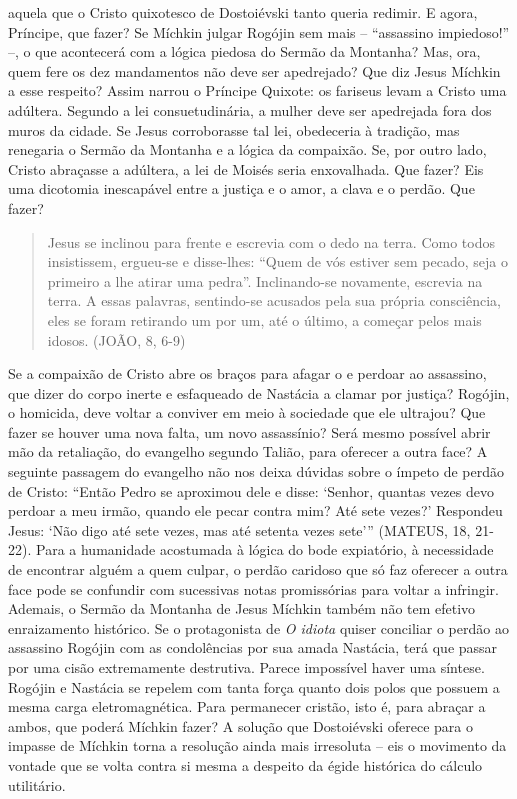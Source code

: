 aquela que o Cristo quixotesco de Dostoiévski tanto queria redimir. E
agora, Príncipe, que fazer? Se Míchkin julgar Rogójin sem mais --
``assassino impiedoso!'' --, o que acontecerá com a lógica piedosa do
Sermão da Montanha? Mas, ora, quem fere os dez mandamentos não deve ser
apedrejado? Que diz Jesus Míchkin a esse respeito? Assim narrou o
Príncipe Quixote: os fariseus levam a Cristo uma adúltera. Segundo a lei
consuetudinária, a mulher deve ser apedrejada fora dos muros da cidade.
Se Jesus corroborasse tal lei, obedeceria à tradição, mas renegaria o
Sermão da Montanha e a lógica da compaixão. Se, por outro lado, Cristo
abraçasse a adúltera, a lei de Moisés seria enxovalhada. Que fazer? Eis
uma dicotomia inescapável entre a justiça e o amor, a clava e o perdão.
Que fazer?

\begin{quote}
Jesus se inclinou para frente e escrevia com o dedo na terra. Como todos
insistissem, ergueu-se e disse-lhes: ``Quem de vós estiver sem pecado,
seja o primeiro a lhe atirar uma pedra''. Inclinando-se novamente,
escrevia na terra. A essas palavras, sentindo-se acusados pela sua
própria consciência, eles se foram retirando um por um, até o último, a
começar pelos mais idosos. (JOÃO, 8, 6-9)
\end{quote}

Se a compaixão de Cristo abre os braços para afagar o e perdoar ao
assassino, que dizer do corpo inerte e esfaqueado de Nastácia a clamar
por justiça? Rogójin, o homicida, deve voltar a conviver em meio à
sociedade que ele ultrajou? Que fazer se houver uma nova falta, um novo
assassínio? Será mesmo possível abrir mão da retaliação, do evangelho
segundo Talião, para oferecer a outra face? A seguinte passagem do
evangelho não nos deixa dúvidas sobre o ímpeto de perdão de Cristo:
``Então Pedro se aproximou dele e disse: `Senhor, quantas vezes devo
perdoar a meu irmão, quando ele pecar contra mim? Até sete vezes?'
Respondeu Jesus: `Não digo até sete vezes, mas até setenta vezes sete'''
(MATEUS, 18, 21-22). Para a humanidade acostumada à lógica do bode
expiatório, à necessidade de encontrar alguém a quem culpar, o perdão
caridoso que só faz oferecer a outra face pode se confundir com
sucessivas notas promissórias para voltar a infringir. Ademais, o Sermão
da Montanha de Jesus Míchkin também não tem efetivo enraizamento
histórico. Se o protagonista de \emph{O idiota} quiser conciliar o
perdão ao assassino Rogójin com as condolências por sua amada Nastácia,
terá que passar por uma cisão extremamente destrutiva. Parece impossível
haver uma síntese. Rogójin e Nastácia se repelem com tanta força quanto
dois polos que possuem a mesma carga eletromagnética. Para permanecer
cristão, isto é, para abraçar a ambos, que poderá Míchkin fazer? A
solução que Dostoiévski oferece para o impasse de Míchkin torna a
resolução ainda mais irresoluta -- eis o movimento da vontade que se
volta contra si mesma a despeito da égide histórica do cálculo
utilitário.

